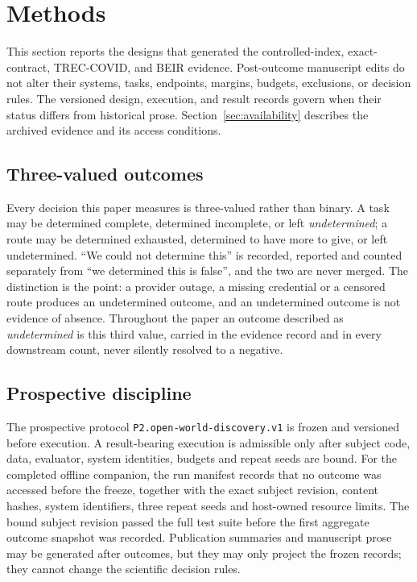 \section{Methods}
\label{sec:methods}

This section reports the designs that generated the controlled-index,
exact-contract, TREC-COVID, and BEIR evidence. Post-outcome manuscript edits do
not alter their systems, tasks, endpoints, margins, budgets, exclusions, or
decision rules. The versioned design, execution, and result records govern when
their status differs from historical prose. Section~\ref{sec:availability}
describes the archived evidence and its access conditions.

\subsection{Three-valued outcomes}
Every decision this paper measures is three-valued rather than binary.  A task
may be determined complete, determined incomplete, or left \emph{undetermined};
a route may be determined exhausted, determined to have more to give, or left
undetermined.  ``We could not determine this'' is recorded, reported and counted
separately from ``we determined this is false'', and the two are never merged.
The distinction is the point: a provider outage, a missing credential or a
censored route produces an undetermined outcome, and an undetermined outcome is
not evidence of absence.  Throughout the paper an outcome described as
\emph{undetermined} is this third value, carried in the evidence record and in
every downstream count, never silently resolved to a negative.

\subsection{Prospective discipline}
The prospective protocol \texttt{P2.open-world-discovery.v1} is frozen and
versioned before execution.  A result-bearing
execution is admissible only after subject code, data, evaluator, system
identities, budgets and repeat seeds are bound.  For the completed offline
companion, the run manifest records that no outcome was accessed before the
freeze, together with the exact subject revision, content hashes,
\OfflineSystemCount{} system identifiers, three repeat seeds and host-owned
resource limits.  The bound subject revision passed the full test suite before
the first aggregate outcome snapshot was recorded.  Publication summaries and
manuscript prose may be generated after outcomes, but they may only project the
frozen records; they cannot change the scientific decision rules.

